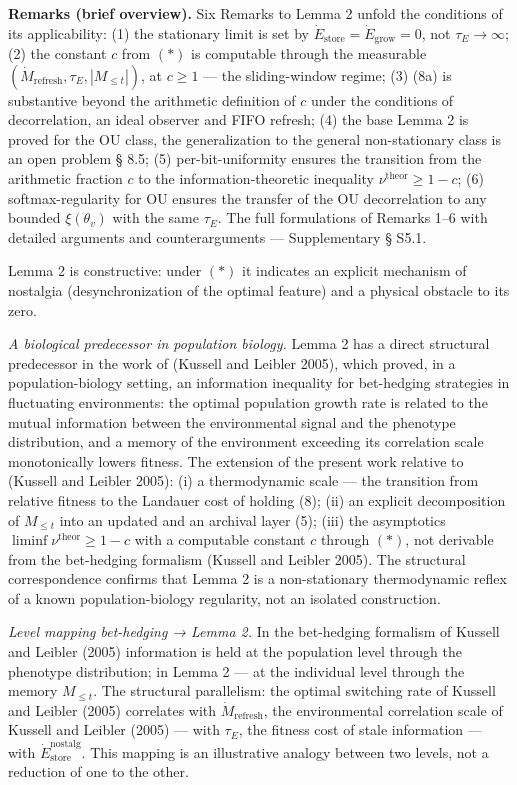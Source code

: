 \documentclass[pdflatex,sn-mathphys-ay]{sn-jnl}
\begin{document}
\textbf{Remarks (brief overview).} Six Remarks to Lemma 2 unfold the conditions of its applicability: (1) the stationary limit is set by \(\dot{E}_{\text{store}} = \dot{E}_{\text{grow}} = 0\), not \(\tau_E \to \infty\); (2) the constant \(c\) from \((*)\) is computable through the measurable \((\dot{M}_{\text{refresh}}, \tau_E, |M_{\le t}|)\), at \(c \ge 1\) --- the sliding-window regime; (3) (8a) is substantive beyond the arithmetic definition of \(c\) under the conditions of decorrelation, an ideal observer and FIFO refresh; (4) the base Lemma 2 is proved for the OU class, the generalization to the general non-stationary class is an open problem § 8.5; (5) per-bit-uniformity ensures the transition from the arithmetic fraction \(c\) to the information-theoretic inequality \(\nu^{\text{theor}} \ge 1-c\); (6) softmax-regularity for OU ensures the transfer of the OU decorrelation to any bounded \(\xi(\theta_v)\) with the same \(\tau_E\). The full formulations of Remarks 1--6 with detailed arguments and counterarguments --- Supplementary § S5.1.



Lemma 2 is constructive: under \((*)\) it indicates an explicit mechanism of nostalgia (desynchronization of the optimal feature) and a physical obstacle to its zero.



\emph{A biological predecessor in population biology.} Lemma 2 has a direct structural predecessor in the work of (Kussell and Leibler 2005), which proved, in a population-biology setting, an information inequality for bet-hedging strategies in fluctuating environments: the optimal population growth rate is related to the mutual information between the environmental signal and the phenotype distribution, and a memory of the environment exceeding its correlation scale monotonically lowers fitness. The extension of the present work relative to (Kussell and Leibler 2005): (i) a thermodynamic scale --- the transition from relative fitness to the Landauer cost of holding (8); (ii) an explicit decomposition of \(M_{\le t}\) into an updated and an archival layer (5); (iii) the asymptotics \(\liminf \nu^{\text{theor}} \ge 1 - c\) with a computable constant \(c\) through \((*)\), not derivable from the bet-hedging formalism (Kussell and Leibler 2005). The structural correspondence confirms that Lemma 2 is a non-stationary thermodynamic reflex of a known population-biology regularity, not an isolated construction.



\emph{Level mapping bet-hedging → Lemma 2.} In the bet-hedging formalism of Kussell and Leibler (2005) information is held at the population level through the phenotype distribution; in Lemma 2 --- at the individual level through the memory \(M_{\le t}\). The structural parallelism: the optimal switching rate of Kussell and Leibler (2005) correlates with \(\dot{M}_{\text{refresh}}\), the environmental correlation scale of Kussell and Leibler (2005) --- with \(\tau_E\), the fitness cost of stale information --- with \(\dot{E}_{\text{store}}^{\text{nostalg}}\). This mapping is an illustrative analogy between two levels, not a reduction of one to the other.
\end{document}
